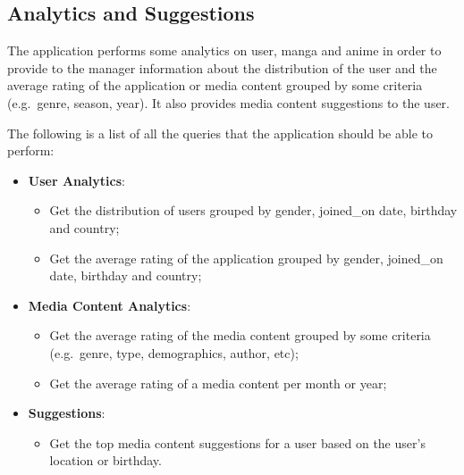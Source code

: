 \subsection*{Analytics and Suggestions}

The application performs some analytics on user, manga and anime in order to provide to the manager information
about the distribution of the user and the average rating of the application or media 
content grouped by some criteria (e.g.\ genre, season, year). It also provides media content suggestions to the user.

\vspace{\baselineskip}

The following is a list of all the queries that the application should be able to perform:

\vspace{\baselineskip}

\begin{itemize}
    \item \textbf{User Analytics}:
    \begin{itemize}
        \item Get the distribution of users grouped by gender, joined\_on date, birthday and country;
        \item Get the average rating of the application grouped by gender, joined\_on date, birthday and country;
    \end{itemize}
    
    \item \textbf{Media Content Analytics}:
    \begin{itemize}
        \item Get the average rating of the media content grouped by some criteria (e.g.\ genre, type, demographics, author, etc);
        \item Get the average rating of a media content per month or year;
    \end{itemize}
    
    \item \textbf{Suggestions}:
    \begin{itemize} 
        \item Get the top media content suggestions for a user based on the user's location or birthday.
    \end{itemize}
\end{itemize}
    
\newpage

